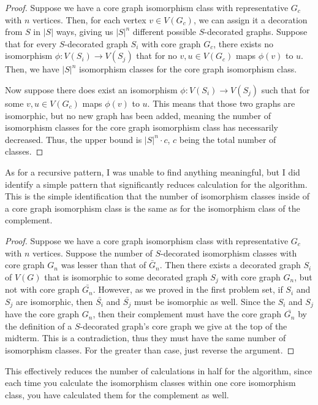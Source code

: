 \documentclass[11pt,reqno]{amsart}
\theoremstyle{definition}
\begin{document}
\begin{proof}
    Suppose we have a core graph isomorphism class with representative $G_c$ with $n$ vertices. Then, for each vertex $v \in V(G_c)$, we can assign it a decoration from $S$ in $|S|$ ways, giving us $|S|^n$ different possible $S$-decorated graphs. Suppose that for every $S$-decorated graph $S_i$ with core graph $G_c$, there exists no isomorphism $\phi: V(S_i) \rightarrow V(S_j)$ that for no $v, u \in V(G_c)$ maps $\phi(v)$ to $u$. Then, we have $|S|^n$ isomorphism classes for the core graph isomorphism class. 

    Now suppose there does exist an isomorphism $\phi: V(S_i) \rightarrow V(S_j)$ such that for some $v, u \in V(G_c)$ maps $\phi(v)$ to $u$. This means that those two graphs are isomorphic, but no new graph has been added, meaning the number of isomorphism classes for the core graph isomorphism class has necessarily decreased. Thus, the upper bound is $|S|^n \cdot c$, $c$ being the total number of classes.
\end{proof}

As for a recursive pattern, I was unable to find anything meaningful, but I did identify a simple pattern that significantly reduces calculation for the algorithm. This is the simple identification that the number of isomorphism classes inside of a core graph isomorphism class is the same as for the isomorphism class of the complement.

\begin{proof}
    Suppose we have a core graph isomorphism class with representative $G_c$ with $n$ vertices. Suppose the number of $S$-decorated isomorphism classes with core graph $G_n$ was lesser than that of $\bar{G}_n$. Then there exists a decorated graph $S_i$ of $V(G)$ that is isomorphic to some decorated graph $S_j$ with core graph $G_n$, but not with core graph $\bar{G_n}$. However, as we proved in the first problem set, if $S_i$ and $S_j$ are isomorphic, then $\bar{S_i}$ and $\bar{S_j}$ must be isomorphic as well. Since the $S_i$ and $S_j$ have the core graph $G_n$, then their complement must have the core graph $\bar{G_n}$ by the definition of a $S$-decorated graph's core graph we give at the top of the midterm. This is a contradiction, thus they must have the same number of isomorphism classes. For the greater than case, just reverse the argument.
\end{proof}

This effectively reduces the number of calculations in half for the algorithm, since each time you calculate the isomorphism classes within one core isomorphism class, you have calculated them for the complement as well. 
\end{document}
